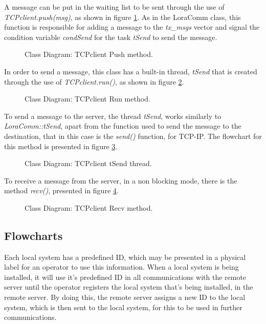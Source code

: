 A message can be put in the waiting list to be sent through the use of \textit{TCPclient.push(msg)}, as shown in figure \ref{fig:TCPclientPush}. As in the LoraComm class, this function is responsible for adding a message to the \textit{tx\_msgs} vector and signal the condition variable \textit{condSend} for the task \textit{tSend} to send the message.

\begin{figure}[H]
	\centering
	\caption{Class Diagram: TCPclient Push method.}
	\label{fig:TCPclientPush}
\end{figure}

In order to send a message, this class has a built-in thread, \textit{tSend} that is created through the use of \textit{TCPclient.run()}, as shown in figure \ref{fig:TCPclientRun}.

\begin{figure}[H]
	\centering
	\caption{Class Diagram: TCPclient Run method.}
	\label{fig:TCPclientRun}
\end{figure}

To send a message to the server, the thread \textit{tSend}, works similarly to \textit{LoraComm::tSend}, apart from the function used to send the message to the destination, that in this case is the \textit{send()} function, for TCP-IP. The flowchart for this method is presented in figure \ref{fig:TCPclientSend}.

\begin{figure}[H]
	\centering
	\caption{Class Diagram: TCPclient tSend thread.}
	\label{fig:TCPclientSend}
\end{figure}

To receive a message from the server, in a non blocking mode, there is the method \textit{recv()}, presented in figure \ref{fig:TCPclientRecv}.

\begin{figure}[H]
	\centering
	\caption{Class Diagram: TCPclient Recv method.}
	\label{fig:TCPclientRecv}
\end{figure}

\subsection{Flowcharts}
Each local system has a predefined ID, which may be presented in a physical label for an operator to use this information. When a local system is being installed, it will use it's predefined ID in all communications with the remote server until the operator registers the local system that's being installed, in the remote server. By doing this, the remote server assigns a new ID to the local system, which is then sent to the local system, for this to be used in further communications.

